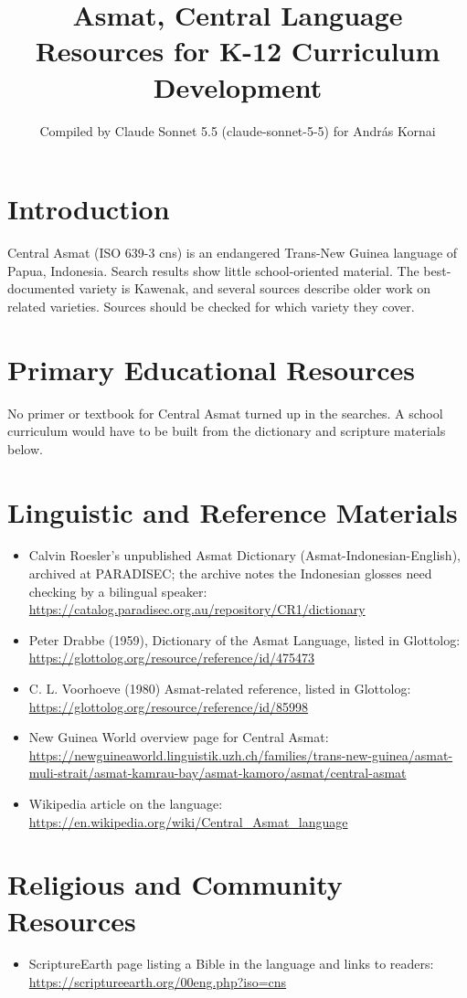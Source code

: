 \documentclass[12pt]{article}
\title{Asmat, Central Language Resources for K-12 Curriculum Development}
\author{Compiled by Claude Sonnet 5.5 (claude-sonnet-5-5) for Andr\'as Kornai}
\date{}
\begin{document}
\maketitle
\section{Introduction}
Central Asmat (ISO 639-3 cns) is an endangered Trans-New Guinea language of Papua, Indonesia. Search results show little school-oriented material. The best-documented variety is Kawenak, and several sources describe older work on related varieties. Sources should be checked for which variety they cover.
\section{Primary Educational Resources}
No primer or textbook for Central Asmat turned up in the searches. A school curriculum would have to be built from the dictionary and scripture materials below.
\section{Linguistic and Reference Materials}
\begin{itemize}
\item Calvin Roesler's unpublished Asmat Dictionary (Asmat-Indonesian-English), archived at PARADISEC; the archive notes the Indonesian glosses need checking by a bilingual speaker: \url{https://catalog.paradisec.org.au/repository/CR1/dictionary}
\item Peter Drabbe (1959), Dictionary of the Asmat Language, listed in Glottolog: \url{https://glottolog.org/resource/reference/id/475473}
\item C. L. Voorhoeve (1980) Asmat-related reference, listed in Glottolog: \url{https://glottolog.org/resource/reference/id/85998}
\item New Guinea World overview page for Central Asmat: \url{https://newguineaworld.linguistik.uzh.ch/families/trans-new-guinea/asmat-muli-strait/asmat-kamrau-bay/asmat-kamoro/asmat/central-asmat}
\item Wikipedia article on the language: \url{https://en.wikipedia.org/wiki/Central_Asmat_language}
\end{itemize}
\section{Religious and Community Resources}
\begin{itemize}
\item ScriptureEarth page listing a Bible in the language and links to readers: \url{https://scriptureearth.org/00eng.php?iso=cns}
\end{itemize}
\end{document}

